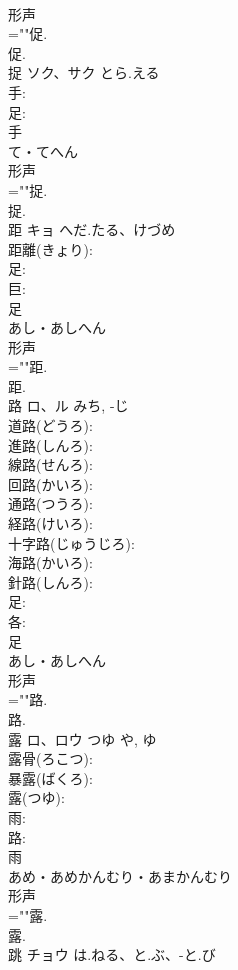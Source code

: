 \documentclass[8pt]{extreport}
\begin{document}
\begin{CJK}{UTF8}{min}
\\	形声 
\\	=""促.
\\	促.
\\	捉	ソク、サク	とら.える		
\\	手: 
\\	足: 
\\	手	
\\	て・てへん	
\\	形声 
\\	=""捉.
\\	捉.
\\	距	キョ	へだ.たる、けづめ		
\\	距離(きょり): 
\\	足: 
\\	巨: 
\\	足	
\\	あし・あしへん	
\\	形声 
\\	=""距.
\\	距.
\\	路	ロ、ル	みち, -じ		
\\	道路(どうろ): 
\\	進路(しんろ): 
\\	線路(せんろ): 
\\	回路(かいろ): 
\\	通路(つうろ): 
\\	経路(けいろ): 
\\	十字路(じゅうじろ): 
\\	海路(かいろ): 
\\	針路(しんろ): 
\\	足: 
\\	各: 
\\	足	
\\	あし・あしへん	
\\	形声 
\\	=""路.
\\	路.
\\	露	ロ、ロウ	つゆ	や, ゆ	
\\	露骨(ろこつ): 
\\	暴露(ばくろ): 
\\	露(つゆ): 
\\	雨: 
\\	路: 
\\	雨	
\\	あめ・あめかんむり・あまかんむり	
\\	形声 
\\	=""露.
\\	露.
\\	跳	チョウ	は.ねる、と.ぶ、-と.び		

\end{CJK}
\end{document}
